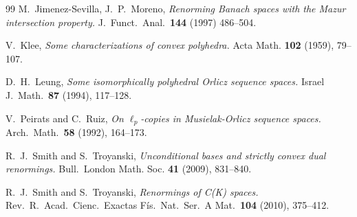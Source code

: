 \documentclass[12pt,a4paper]{amsart}
\theoremstyle{definition}
\theoremstyle{remark}
\begin{document}
\begin{thebibliography}{99}
 M.\ Jimenez-Sevilla, J.\ P.\ Moreno, {\em Renorming
Banach spaces with the Mazur intersection property.} J.\ Funct.\ Anal.\
\textbf{144} (1997) 486--504.

 V.\ Klee, {\em Some characterizations of convex
polyhedra.} Acta Math. \textbf{102} (1959), 79--107.

 D.\ H.\ Leung, {\em Some isomorphically polyhedral
Orlicz sequence spaces.} Israel J.\ Math.\ \textbf{87} (1994), 117--128.

 V.\ Peirats and C.\ Ruiz, {\em On $\ell_p$-copies
in Musielak-Orlicz sequence spaces.} Arch.\ Math.\ \textbf{58}
(1992), 164--173.

 R.\ J.\ Smith and S.\ Troyanski, {\em Unconditional bases
and strictly convex dual renormings.} Bull.\ London Math. Soc.
\textbf{41} (2009), 831--840.

 R.\ J.\ Smith and S.\ Troyanski, {\em Renormings of
C(K) spaces.} Rev.\ R.\ Acad.\ Cienc.\ Exactas F\'is.\ Nat.\ Ser.\ A
Mat.\ \textbf{104} (2010), 375--412.
\end{thebibliography}
\end{document}
